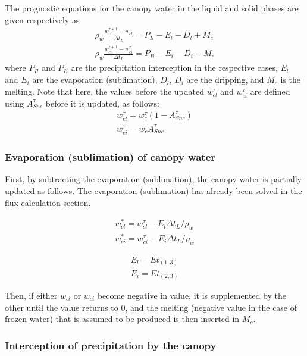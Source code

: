 The prognostic equations for the canopy water in the liquid and solid phases are given respectively as \begin{eqnarray}
 \rho_w \frac{w_{cl}^{\tau+1} - w_{cl}^{\tau}}{\Delta t_L}
  = P_{Il} - E_l - D_l + M_c \\
 \rho_w \frac{w_{ci}^{\tau+1} - w_{ci}^{\tau}}{\Delta t_L}
  = P_{Ii} - E_i - D_i - M_c
\end{eqnarray} where \(P_{Il}\) and \(P_{Ii}\) are the precipitation interception in the respective cases, \(E_l\) and \(E_i\) are the evaporation (sublimation), \(D_l\), \(D_i\) are the dripping, and \(M_c\) is
the melting. Note that here, the values before the updated \(w_{cl}^{\tau}\) and \(w_{ci}^{\tau}\) are defined using \(A_{Snc}^{\tau}\) before it is updated, as follows: \begin{eqnarray}
 w_{cl}^{\tau} = w_c^{\tau} ( 1 - A_{Snc}^{\tau}) \\
 w_{ci}^{\tau} = w_c^{\tau} A_{Snc}^{\tau}
\end{eqnarray}

\subsubsection{Evaporation (sublimation) of canopy water}\label{evaporation-sublimation-of-canopy-water}

First, by subtracting the evaporation (sublimation), the canopy water is partially updated as follows. The evaporation (sublimation) has already been solved in the flux calculation section.

\begin{eqnarray}
 w_{cl}^\ast = w_{cl}^{\tau} - E_l \Delta t_L / \rho_w \\
 w_{ci}^\ast = w_{ci}^{\tau} - E_i \Delta t_L / \rho_w
\end{eqnarray}

\begin{eqnarray}
 E_l = Et_{(1,3)} \\
 E_i = Et_{(2,3)}
\end{eqnarray}

Then, if either \(w_{cl}\) or \(w_{ci}\) become negative in value, it is supplemented by the other until the value returns to 0, and the melting (negative value in the case of frozen water) that is
assumed to be produced is then inserted in \(M_c\).

\subsubsection{Interception of precipitation by the canopy}\label{interception-of-precipitation-by-the-canopy}


